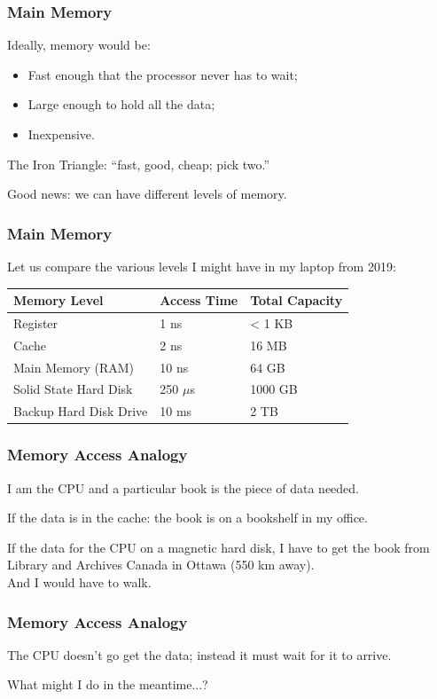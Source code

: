 \begin{frame}
\frametitle{Main Memory}
Ideally, memory would be:

\begin{itemize}
	\item Fast enough that the processor never has to wait;
	\item Large enough to hold all the data;
	\item Inexpensive.
\end{itemize}

The \alert{Iron Triangle}: ``fast, good, cheap; pick two.''

Good news: we can have different levels of memory.

\end{frame}

\begin{frame}
\frametitle{Main Memory}

Let us compare the various levels I might have in my laptop from 2019:

\begin{center}
	\begin{tabular}{l|l|l}
	\textbf{Memory Level} & \textbf{Access Time} & \textbf{Total Capacity} \\ \hline
	Register & 1 ns & < 1 KB \\
	Cache & 2 ns & 16 MB \\
	Main Memory (RAM) & 10 ns & 64 GB \\
	Solid State Hard Disk & 250 $\mu$s & 1000 GB \\
	Backup Hard Disk Drive & 10 ms & 2 TB \\
	\end{tabular}
\end{center}


\end{frame}

\begin{frame}
\frametitle{Memory Access Analogy}
I am the CPU and a particular book is the piece of data needed.

If the data is in the cache: the book is on a bookshelf in my office.

If the data for the CPU on a magnetic hard disk, I have to get the book from Library and Archives Canada in Ottawa (550 km away).\\
\quad And I would have to walk.

\end{frame}

\begin{frame}
\frametitle{Memory Access Analogy}

The CPU doesn't go get the data; instead it must wait for it to arrive.

What might I do in the meantime...?

\end{frame}

